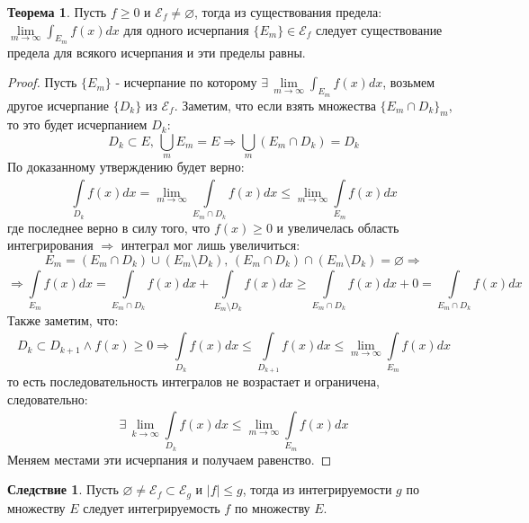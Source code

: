 \documentclass[12pt]{article}
\newcommand{\ME}{\mathcal{E}}
\newcommand{\VN}{\varnothing}
\theoremstyle{definition}
\newtheorem{theorem}{Теорема}
\newtheorem{corollary}{Следствие}
\newcommand{\ddint}[2]{\displaystyle\int\limits_{#1}^{#2}}
\begin{document}
\begin{theorem}
	Пусть $f \geq 0$ и $\ME_f \neq \VN$, тогда из существования предела: $\lim\limits_{m \to \infty}\int_{E_m}f(x)dx$ для одного исчерпания $\{E_m\} \in \ME_f$ следует существование предела для всякого исчерпания и эти пределы равны.
\end{theorem}
\begin{proof}
	Пусть $\{E_m\}$ - исчерпание по которому $\exists \, \lim\limits_{m \to \infty}\int_{E_m}f(x)dx$, возьмем другое исчерпание $\{D_k\}$ из $\ME_f$. Заметим, что если взять множества $\{E_m \cap D_k\}_m$, то это будет исчерпанием $D_k$:
	$$
		D_k \subset E, \, \bigcup\limits_m E_m = E \Rightarrow \bigcup\limits_{m}(E_m \cap D_k) = D_k
	$$
	По доказанному утверждению будет верно:
	$$
		\ddint{D_k}{}f(x)dx = \lim\limits_{m \to \infty}\ddint{E_m \cap D_k}{}f(x)dx \leq \lim\limits_{m \to \infty}\ddint{E_m }{}f(x)dx
	$$
	где последнее верно в силу того, что $f(x) \geq 0$ и увеличелась область интегрирования $\Rightarrow$ интеграл мог лишь увеличиться: 
	$$
		E_m = (E_m \cap D_k) \cup (E_m \setminus D_k), \, (E_m \cap D_k) \cap (E_m \setminus D_k) = \VN \Rightarrow 
	$$
	$$
		\Rightarrow \ddint{E_m}{}f(x)dx =  \ddint{E_m \cap D_k}{}f(x)dx + \ddint{E_m \setminus D_k}{}f(x)dx \geq \ddint{E_m \cap D_k}{}f(x)dx + 0 = \ddint{E_m \cap D_k}{}f(x)dx
	$$
	Также заметим, что: 
	$$
		D_k \subset D_{k +1 } \wedge f(x) \geq 0 \Rightarrow \ddint{D_k}{}f(x)dx \leq \ddint{D_{k+1}}{}f(x)dx \leq \lim\limits_{m \to \infty}\ddint{E_m }{}f(x)dx
	$$ 
	то есть последовательность интегралов не возрастает и ограничена, следовательно:
	$$
		\exists \, \lim \limits_{k \to \infty} \ddint{D_k}{}f(x)dx \leq  \lim\limits_{m \to \infty}\ddint{E_m }{}f(x)dx
	$$
	Меняем местами эти исчерпания и получаем равенство.
\end{proof}
\begin{corollary}
	Пусть $\VN \neq \ME_f \subset \ME_g$ и $|f| \leq g$, тогда из интегрируемости $g$ по множеству $E$ следует интегрируемость $f$ по множеству $E$.
\end{corollary}
\end{document}
